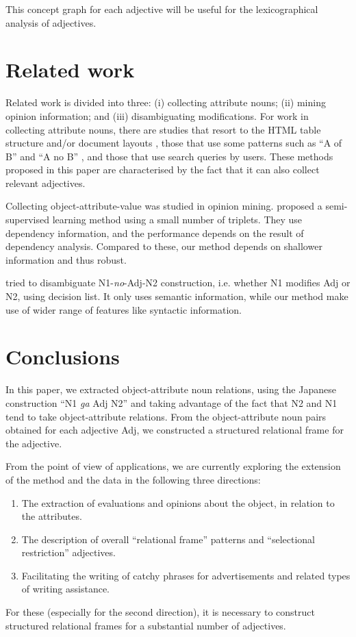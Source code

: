 \documentclass[english]{jnlp_1.4}
\begin{document}
This concept graph for each adjective will be useful for the 
lexicographical analysis of adjectives.


\section{Related work}

Related work is divided into three: (i) collecting attribute nouns; (ii)
mining opinion information; and (iii) disambiguating modifications.  For
work in collecting attribute nouns, there are studies that resort to the
HTML table structure \cite{yoshida:2004} and/or document layouts
\cite{tokunaga:2005,yoshinaga:2007}, those that use some patterns such
as ``A of B'' \cite{matthew:1999,abdulrahman:2004} and ``A no B''
\cite{tokunaga:2005,yoshinaga:2007}, and those that use search queries
by users. These methods proposed in this paper are characterised by the
fact that it can also collect relevant adjectives.

Collecting object-attribute-value was studied in opinion
mining. \cite{suzuki:2006} proposed a semi-supervised learning method
using a small number of triplets. 
They use
dependency information, and the performance depends on the result of
dependency analysis. Compared to these, our method depends on shallower
information and thus robust.

\cite{hashimoto:2001} tried to disambiguate N1-{\it no}-Adj-N2 construction,
i.e. whether N1 modifies Adj or N2, using decision list. It only uses
semantic information, while our method make use of wider range of
features like syntactic information.

\section{Conclusions}


In this paper, we extracted object-attribute noun relations, using the
Japanese construction ``N1 {\it ga} Adj N2'' and taking advantage of the
fact that N2 and N1 tend to take object-attribute relations. From the
object-attribute noun pairs obtained for each adjective Adj, we
constructed a structured relational frame for the adjective.

From the point of view of applications, we are currently exploring 
the extension of the method and the data in the following three directions:
\begin{enumerate}
\item The extraction of evaluations and opinions about the object,
in relation to the attributes. 
\item The description of overall ``relational frame'' patterns and 
``selectional restriction'' adjectives.
\item Facilitating the writing of catchy phrases for advertisements
and related types of writing assistance.
\end{enumerate}
For these (especially for the second direction), it is necessary to 
construct structured relational frames for a substantial number of adjectives.
\end{document}
